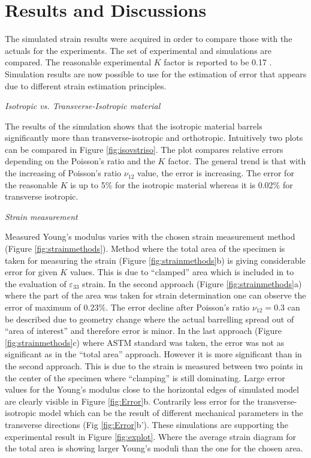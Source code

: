 \documentclass[review]{elsarticle}
\begin{document}
\section{Results and Discussions}
The simulated strain results were acquired in order to compare those with the
actuals for the experiments. The set of experimental and simulations are
compared. The reasonable experimental $K$ factor is reported to be 0.17
\cite{Toftegaard1999849}. Simulation results are now possible to use for the
estimation of error that appears due to different strain estimation principles.

\begin{description}
\item{\textit{Isotropic vs. Transverse-Isotropic material}}
\end{description}
The results of the simulation shows that the isotropic material barrels
significantly more than transverse-isotropic and orthotropic. 
Intuitively two plots can be compared in Figure \ref{fig:isovstriso}. The plot
compares relative errors depending on the Poisson's ratio and the $K$
factor. The general trend is that with the increasing of Poisson's ratio
$\nu_{12}$ value, the error is increasing. The error for the reasonable $K$ is
up to 5\% for the isotropic material whereas it is 0.02\% for transverse
isotropic. 
\begin{description}
\item{\textit{Strain measurement}}
\end{description}
Measured Young's modulus varies with the chosen strain measurement method
(Figure \ref{fig:strainmethods}). Method where the total area of the specimen is
taken for measuring the strain (Figure \ref{fig:strainmethods}b) is giving
considerable error for given $K$ values. This is due to ``clamped'' area which
is included in to the evaluation of $\varepsilon_{33}$ strain. In the second 
approach (Figure \ref{fig:strainmethods}a) where the part of the area was taken
for strain determination one can observe the error of maximum of $0.23\%$. The error decline after Poisson's
ratio $\nu_{12}=0.3$ can be described due to geometry change where the actual
barrelling spread out of ``area of interest'' and therefore error is minor.
In the last approach (Figure \ref{fig:strainmethods}c) where ASTM standard was
taken, the error was not as significant as in the ``total area'' approach. 
However it is more significant than in the second approach. This is due to the
strain is measured between two points in the center of the specimen where
``clamping'' is still dominating. Large error values for the Young's modulus
close to the horizontal edges of simulated model are clearly visible in
Figure \ref{fig:Error}b. Contrarily less error for the transverse-isotropic
model which can be the result of different mechanical parameters in the
transverse directions (Fig \ref{fig:Error}b'). These simulations are supporting
the experimental result in Figure \ref{fig:explot}. Where the
average strain diagram for the total area is showing larger Young's moduli than
the one for the chosen area.
\end{document}
